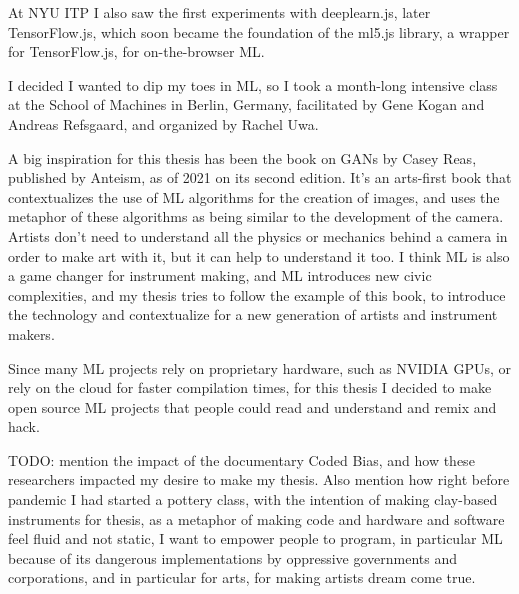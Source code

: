 At \acrshort{NYU} \acrshort{ITP} I also saw the first experiments with deeplearn.js, later TensorFlow.js, which soon became the foundation of the ml5.js library, a wrapper for TensorFlow.js, for on-the-browser \acrshort{ML}.

I decided I wanted to dip my toes in \acrshort{ML}, so I took a month-long intensive class at the School of Machines in Berlin, Germany, facilitated by Gene Kogan and Andreas Refsgaard, and organized by Rachel Uwa.


A big inspiration for this thesis has been the book on GANs by Casey Reas, published by Anteism, as of 2021 on its second edition. It’s an arts-first book that contextualizes the use of \acrshort{ML} algorithms for the creation of images, and uses the metaphor of these algorithms as being similar to the development of the camera. Artists don’t need to understand all the physics or mechanics behind a camera in order to make art with it, but it can help to understand it too. I think \acrshort{ML} is also a game changer for instrument making, and \acrshort{ML} introduces new civic complexities, and my thesis tries to follow the example of this book, to introduce the technology and contextualize for a new generation of artists and instrument makers.

Since many \acrshort{ML} projects rely on proprietary hardware, such as NVIDIA GPUs, or rely on the cloud for faster compilation times, for this thesis I decided to make open source \acrshort{ML} projects that people could read and understand and remix and hack.

TODO: mention the impact of the documentary Coded Bias, and how these researchers impacted my desire to make my thesis. Also mention how right before pandemic I had started a pottery class, with the intention of making clay-based instruments for thesis, as a metaphor of making code and hardware and software feel fluid and not static, I want to empower people to program, in particular \acrshort{ML} because of its dangerous implementations by oppressive governments and corporations, and in particular for arts, for making artists dream come true.
